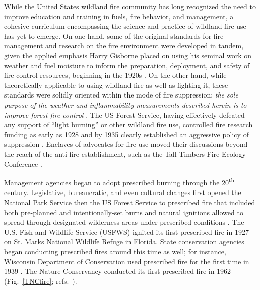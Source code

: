 \documentclass[fire,article,submit,moreauthors,pdftex]{Definitions/mdpi}
\begin{document}
While the United States wildland fire community has long recognized the need to improve education and training in fuels, fire behavior, and management, a cohesive curriculum encompassing the science and practice of wildland fire use has yet to emerge.
On one hand, some of the original standards for fire management and research on the fire environment were developed in tandem, given the applied emphasis Harry Gisborne placed on using his seminal work on weather and fuel moisture to inform the preparation, deployment, and safety of fire control resources, beginning in the 1920s \citep{hardy1983}.
On the other hand, while theoretically applicable to using wildland fire as well as fighting it, these standards were solidly oriented within the mode of fire suppression: \emph{the sole purpose of the weather and inflammability measurements described herein is to improve forest-fire control} \citep{gisborne1936}.
The US Forest Service, having effectively defeated any support of ``light burning'' or other wildland fire use, controlled fire research funding as early as 1928 and by 1935 clearly established an aggressive policy of suppression \citep{pyne2015}.
Enclaves of advocates for fire use moved their discussions beyond the reach of the anti-fire establishment, such as the Tall Timbers Fire Ecology Conference \citep{pyne2015}.

Management agencies began to adopt prescribed burning through the 20\textsuperscript{th} century.
Legislative, bureaucratic, and even cultural changes first opened the National Park Service then the US Forest Service to prescribed fire that included both pre-planned and intentionally-set burns and natural ignitions allowed to spread through designated wilderness areas under prescribed conditions \citep{pyne2015}.
The U.S. Fish and Wildlife Service (USFWS) ignited its first prescribed fire in 1927 on St. Marks National Wildlife Refuge in Florida.
State conservation agencies began conducting prescribed fires around this time as well; for instance, Wisconsin Department of Conservation used prescribed fire for the first time in 1939 \cite{vogl1967}.
The Nature Conservancy conducted its first prescribed fire in 1962 (Fig.~\ref{TNCfire}; refs.~\citep{pyne2015, tnc2022}).
\end{document}
